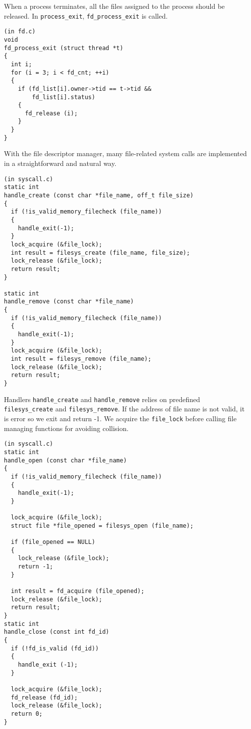 \documentclass[a4paper,article,11pt,oneside]{article}
\begin{document}
When a process terminates, all the files assigned to the process
should be released. In \texttt{process\_exit},
\texttt{fd\_process\_exit} is called.

\begin{verbatim}
(in fd.c)
void
fd_process_exit (struct thread *t)
{
  int i;
  for (i = 3; i < fd_cnt; ++i)
  {
    if (fd_list[i].owner->tid == t->tid &&
        fd_list[i].status)
    {
      fd_release (i);
    }
  }
}
\end{verbatim}

With the file descriptor manager, many file-related system calls are
implemented in a straightforward and natural way.

\begin{verbatim}
(in syscall.c)
static int
handle_create (const char *file_name, off_t file_size)
{
  if (!is_valid_memory_filecheck (file_name))
  {
    handle_exit(-1);
  }
  lock_acquire (&file_lock);
  int result = filesys_create (file_name, file_size);
  lock_release (&file_lock);
  return result;
}

static int
handle_remove (const char *file_name)
{
  if (!is_valid_memory_filecheck (file_name))
  {
    handle_exit(-1);
  }
  lock_acquire (&file_lock);
  int result = filesys_remove (file_name);
  lock_release (&file_lock);
  return result;
}
\end{verbatim}

Handlers \texttt{handle\_create} and \texttt{handle\_remove} relies on
predefined \texttt{filesys\_create} and \texttt{filesys\_remove}. If
the address of file name is not valid, it is error so we exit and
return -1. We acquire the \texttt{file\_lock} before calling file
managing functions for avoiding collision.

\begin{verbatim}
(in syscall.c)
static int
handle_open (const char *file_name)
{
  if (!is_valid_memory_filecheck (file_name))
  {
    handle_exit(-1);
  }

  lock_acquire (&file_lock);
  struct file *file_opened = filesys_open (file_name);

  if (file_opened == NULL)
  {
    lock_release (&file_lock);
    return -1;
  }

  int result = fd_acquire (file_opened);
  lock_release (&file_lock);
  return result;
}
static int
handle_close (const int fd_id)
{
  if (!fd_is_valid (fd_id))
  {
    handle_exit (-1);
  }
  
  lock_acquire (&file_lock);
  fd_release (fd_id);
  lock_release (&file_lock);
  return 0;
}
\end{verbatim}
\end{document}
